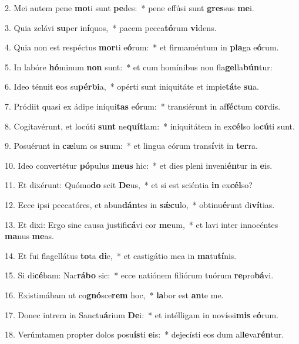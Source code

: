 2. Mei autem pene \textbf{mo}ti sunt \textbf{pe}des:~*  pene effúsi sunt \textbf{gres}sus \textbf{me}i.\

3. Quia zelávi \textbf{su}per in\textbf{í}quos,~*  pacem pecca\textbf{tó}rum \textbf{vi}dens.\

4. Quia non est respéctus \textbf{mor}ti e\textbf{ó}rum:~*  et firmaméntum in \textbf{pla}ga e\textbf{ó}rum.\

5. In labóre \textbf{hó}minum \textbf{non} sunt:~*  et cum homínibus non fla\textbf{gel}la\textbf{bún}tur:\

6. Ideo ténuit \textbf{e}os su\textbf{pér}\textbf{bi}a,~*  opérti sunt iniquitáte et impie\textbf{tá}te \textbf{su}a.\

7. Pródiit quasi ex ádipe iníqui\textbf{tas} e\textbf{ó}rum:~*  transiérunt in af\textbf{féc}tum \textbf{cor}dis.\

8. Cogitavérunt, et locúti \textbf{sunt} ne\textbf{quí}\textbf{ti}am:~*  iniquitátem in ex\textbf{cél}so lo\textbf{cú}ti sunt.\

9. Posuérunt in \textbf{cæ}lum os \textbf{su}um:~*  et lingua eórum trans\textbf{í}vit in \textbf{ter}ra.\

10. Ideo convertétur \textbf{pó}pulus \textbf{me}\textbf{us} hic:~*  et dies pleni inveni\textbf{én}tur in \textbf{e}is.\

11. Et dixérunt: Quómo\textbf{do} scit \textbf{De}us,~*  et si est sciéntia \textbf{in} ex\textbf{cél}so?\

12. Ecce ipsi peccatóres, et abun\textbf{dán}tes in \textbf{sǽ}\textbf{cu}lo,~*  obtinu\textbf{é}runt di\textbf{ví}tias.\

13. Et dixi: Ergo sine causa justifi\textbf{cá}vi cor \textbf{me}um,~*  et lavi inter innocéntes \textbf{ma}nus \textbf{me}as.\

14. Et fui flagellátus \textbf{to}ta \textbf{di}e,~*  et castigátio mea in \textbf{ma}tu\textbf{tí}nis.\

15. Si di\textbf{cé}bam: Nar\textbf{rá}\textbf{bo} sic:~*  ecce natiónem filiórum tuórum \textbf{re}pro\textbf{bá}vi.\

16. Existimábam ut co\textbf{gnó}sce\textbf{rem} hoc,~*  \textbf{la}bor est \textbf{an}te me.\

17. Donec intrem in Sanctu\textbf{á}rium \textbf{De}i:~*  et intélligam in novíssi\textbf{mis} e\textbf{ó}rum.\

18. Verúmtamen propter dolos posu\textbf{ís}ti \textbf{e}is:~*  dejecísti eos dum al\textbf{le}va\textbf{rén}tur.\

